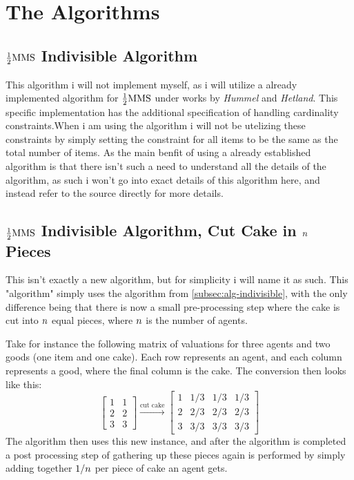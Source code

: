 \section{The Algorithms}\label{sec:the-algorithms}

\subsection{\texorpdfstring{$\frac{1}{2}\text{MMS}$}{1/2MMS} Indivisible Algorithm}\label{subsec:alg-indivisible}

This algorithm i will not implement myself, as i will utilize a already implemented algorithm\cite{Allocations} for $\frac{1}{2}\text{MMS}$ under works by \emph{Hummel} and \emph{Hetland}. This specific implementation has the additional specification of handling cardinality constraints.When i am using the algorithm i will not be utelizing these constraints by simply setting the constraint for all items to be the same as the total number of items. As the main benfit of using a already established algorithm is that there isn't such a need to understand all the details of the algorithm, as such i won't go into exact details of this algorithm here, and instead refer to the source directly for more details\cite{Allocations}.




\subsection{\texorpdfstring{$\frac{1}{2}\text{MMS}$}{1/2MMS} Indivisible Algorithm, Cut Cake in \texorpdfstring{$n$}{n} Pieces}\label{subsec:alg-cut-cake}

This isn't exactly a new algorithm, but for simplicity i will name it as such. This "algorithm" simply uses the algorithm from \autoref{subsec:alg-indivisible}, with the only difference being that there is now a small pre-processing step where the cake is cut into $n$ equal pieces, where $n$ is the number of agents. 

Take for instance the following matrix of valuations for three agents and two goods (one item and one cake). Each row represents an agent, and each column represents a good, where the final column is the cake. The conversion then looks like this:
$$
    \begin{bmatrix}
        1 & 1 \\
        2 & 2 \\
        3 & 3
    \end{bmatrix}
    \overset{\text{cut cake}}{\rightarrow}
    \begin{bmatrix}
        1 & 1/3 & 1/3 & 1/3 \\
        2 & 2/3 & 2/3 & 2/3 \\
        3 & 3/3 & 3/3 & 3/3
    \end{bmatrix}
$$
The algorithm then uses this new instance, and after the algorithm is completed a post processing step of gathering up these pieces again is performed by simply adding together $1/n$ per piece of cake an agent gets.

